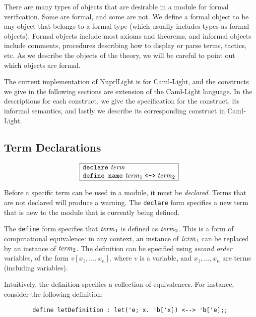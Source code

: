 \documentclass{article}
\newcommand\NuprlLight{NuprlLight}
\newcommand\ttmetaleftrightarrow{\mathrel{\hbox{\tt <-->}}}
\newcommand\syntax{\noindent{\bf Syntax}\makebox[1in]{\dotfill}\rule[-1em]{0em}{3em}\par\noindent}
\begin{document}
There are many types of objects that are desirable in a module for formal verification.  Some are
formal, and some are not.  We define a formal object to be any object that belongs to a formal type
(which usually includes types as formal objects). Formal objects include most axioms and theorems,
and informal objects include comments, procedures describing how to display or parse terms, tactics,
etc. As we describe the objects of the theory, we will be careful to point out which objects are
formal.

The current implementation of \NuprlLight{} is for Caml-Light, and the constructs we give in the
following sections are extension of the Caml-Light language.  In the descriptions for each
construct, we give the specification for the construct, its informal semantics, and lastly we
describe its corresponding construct in Caml-Light.

\subsection{Term Declarations}

\syntax

$$
\begin{array}{|l|}
\hline
\hbox{\tt declare}\ {\it term}\\
\hbox{\tt define name}\ {\it term}_1 \ttmetaleftrightarrow {\it term}_2\\
\hline
\end{array}
$$

Before a specific term can be used in a module, it must be {\em declared}.  Terms that are not
declared will produce a warning.  The {\tt declare} form specifies a new term that is new to the
module that is currently being defined.

The {\tt define} form specifies that ${\it term}_1$ is defined as ${\it term}_2$.  This is a form of
computational equivalence: in any context, an instance of ${\it term}_1$ can be replaced by an
instance of ${\it term}_2$.  The definition can be specified using {\em second order\/} variables, of the
form $v[x_1, \ldots, x_n]$, where $v$ is a variable, and $x_1, \ldots, x_n$ are terms (including
variables).

Intuitively, the definition specifies a collection of equivalences.
For instance, consider the following definition:

\begin{verbatim}
        define letDefinition : let('e; x. 'b['x]) <--> 'b['e];;
\end{verbatim}
\end{document}
